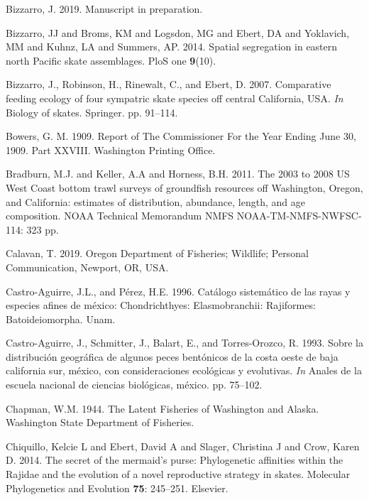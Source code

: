 \documentclass[12pt,]{article}
\begin{document}
\leavevmode\hypertarget{ref-Bizzarro2019}{}%
Bizzarro, J. 2019. Manuscript in preparation.

\leavevmode\hypertarget{ref-Bizzarro2014}{}%
Bizzarro, JJ and Broms, KM and Logsdon, MG and Ebert, DA and Yoklavich,
MM and Kuhnz, LA and Summers, AP. 2014. Spatial segregation in eastern
north Pacific skate assemblages. PloS one \textbf{9}(10).

\leavevmode\hypertarget{ref-Bizzarro2007}{}%
Bizzarro, J., Robinson, H., Rinewalt, C., and Ebert, D. 2007.
Comparative feeding ecology of four sympatric skate species off central
California, USA. \emph{In} Biology of skates. Springer. pp. 91--114.

\leavevmode\hypertarget{ref-Bowers1909}{}%
Bowers, G. M. 1909. Report of The Commissioner For the Year Ending June
30, 1909. Part XXVIII. Washington Printing Office.

\leavevmode\hypertarget{ref-Bradburn2011}{}%
Bradburn, M.J. and Keller, A.A and Horness, B.H. 2011. The 2003 to 2008
US West Coast bottom trawl surveys of groundfish resources off
Washington, Oregon, and California: estimates of distribution,
abundance, length, and age composition. NOAA Technical Memorandum NMFS
NOAA-TM-NMFS-NWFSC-114: 323 pp.

\leavevmode\hypertarget{ref-TedCalavan}{}%
Calavan, T. 2019. Oregon Department of Fisheries; Wildlife; Personal
Communication, Newport, OR, USA.

\leavevmode\hypertarget{ref-Castro1996}{}%
Castro-Aguirre, J.L., and Pérez, H.E. 1996. Catálogo sistemático de las
rayas y especies afines de méxico: Chondrichthyes: Elasmobranchii:
Rajiformes: Batoideiomorpha. Unam.

\leavevmode\hypertarget{ref-Castro1993}{}%
Castro-Aguirre, J., Schmitter, J., Balart, E., and Torres-Orozco, R.
1993. Sobre la distribución geográfica de algunos peces bentónicos de la
costa oeste de baja california sur, méxico, con consideraciones
ecológicas y evolutivas. \emph{In} Anales de la escuela nacional de
ciencias biológicas, méxico. pp. 75--102.

\leavevmode\hypertarget{ref-Chapman1944}{}%
Chapman, W.M. 1944. The Latent Fisheries of Washington and Alaska.
Washington State Department of Fisheries.

\leavevmode\hypertarget{ref-Chiquillo2014}{}%
Chiquillo, Kelcie L and Ebert, David A and Slager, Christina J and Crow,
Karen D. 2014. The secret of the mermaid's purse: Phylogenetic
affinities within the Rajidae and the evolution of a novel reproductive
strategy in skates. Molecular Phylogenetics and Evolution \textbf{75}:
245--251. Elsevier.
\end{document}
